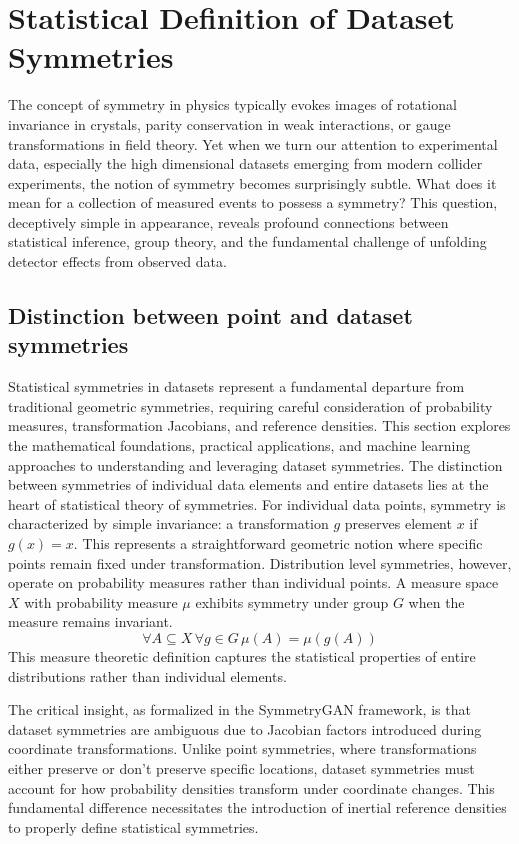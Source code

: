 \section{Statistical Definition of Dataset Symmetries}
    \label{sec:statistical-symmetries}
    The concept of symmetry in physics typically evokes images of rotational invariance in crystals, parity conservation in weak interactions, or gauge transformations in field theory.
    Yet when we turn our attention to experimental data, especially the high dimensional datasets emerging from modern collider experiments, the notion of symmetry becomes surprisingly subtle.
    What does it mean for a collection of measured events to possess a symmetry?
    This question, deceptively simple in appearance, reveals profound connections between statistical inference, group theory, and the fundamental challenge of unfolding detector effects from observed data.
    \subsection{Distinction between point and dataset symmetries}
        Statistical symmetries in datasets represent a fundamental departure from traditional geometric symmetries, requiring careful consideration of probability measures, transformation Jacobians, and reference densities.
        This section explores the mathematical foundations, practical applications, and machine learning approaches to understanding and leveraging dataset symmetries.
        The distinction between symmetries of individual data elements and entire datasets lies at the heart of statistical theory of symmetries.
        For individual data points, symmetry is characterized by simple invariance: a transformation \(g\) preserves element \(x\) if \(g(x) = x\). This represents a straightforward geometric notion where specific points remain fixed under transformation.
        Distribution level symmetries, however, operate on probability measures rather than individual points.
        A measure space \(X\) with probability measure \(\mu\) exhibits symmetry under group \(G\) when the measure remains invariant.\kd{}
        \[
            \forall A\subseteq X \, \forall g\in G\, \mu(A) = \mu(g(A))
        \]
        This measure theoretic definition captures the statistical properties of entire distributions rather than individual elements.
        
        The critical insight, as formalized in the SymmetryGAN framework, is that dataset symmetries are ambiguous due to Jacobian factors introduced during coordinate transformations.\kd{}
        Unlike point symmetries, where transformations either preserve or don't preserve specific locations, dataset symmetries must account for how probability densities transform under coordinate changes.
        This fundamental difference necessitates the introduction of inertial reference densities to properly define statistical symmetries.
